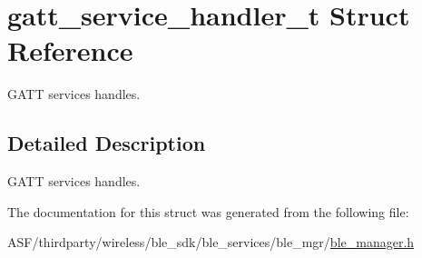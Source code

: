 \hypertarget{structgatt__service__handler__t}{}\section{gatt\+\_\+service\+\_\+handler\+\_\+t Struct Reference}
\label{structgatt__service__handler__t}


G\+A\+TT services handles.  




\subsection{Detailed Description}
G\+A\+TT services handles. 

The documentation for this struct was generated from the following file\+:\begin{DoxyCompactItemize}
\item 
A\+S\+F/thirdparty/wireless/ble\+\_\+sdk/ble\+\_\+services/ble\+\_\+mgr/\mbox{\hyperlink{ble__manager_8h}{ble\+\_\+manager.\+h}}\end{DoxyCompactItemize}
